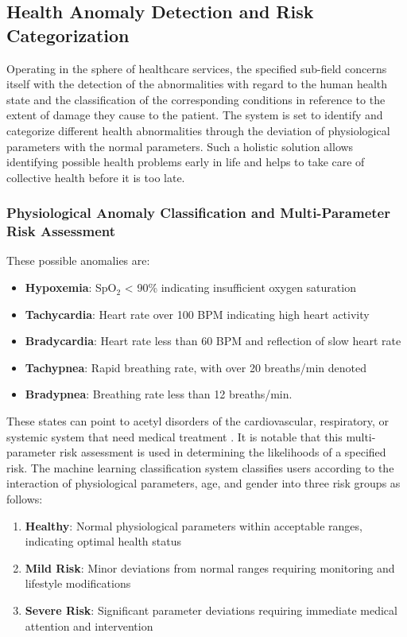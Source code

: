 \documentclass{ieeeaccess}
\begin{document}
\FloatBarrier

\subsection{Health Anomaly Detection and Risk Categorization}

Operating in the sphere of healthcare services, the specified sub-field concerns itself with the detection of the abnormalities with regard to the human health state and the classification of the corresponding conditions in reference to the extent of damage they cause to the patient. The system is set to identify and categorize different health abnormalities through the deviation of physiological parameters with the normal parameters. Such a holistic solution allows identifying possible health problems early in life and helps to take care of collective health before it is too late.

\subsubsection{Physiological Anomaly Classification and Multi-Parameter Risk Assessment}

These possible anomalies are:
\begin{itemize}
\item \textbf{Hypoxemia}: SpO$_2$ < 90\% indicating insufficient oxygen saturation
\item \textbf{Tachycardia}: Heart rate over 100 BPM indicating high heart activity
\item \textbf{Bradycardia}: Heart rate less than 60 BPM and reflection of slow heart rate
\item \textbf{Tachypnea}: Rapid breathing rate, with over 20 breaths/min denoted
\item \textbf{Bradypnea}: Breathing rate less than 12 breaths/min.
\end{itemize}
\vspace{0.5em}



These states can point to acetyl disorders of the cardiovascular, respiratory, or systemic system that need medical treatment \cite{b21}. It is notable that this multi-parameter risk assessment is used in determining the likelihoods of a specified risk. The machine learning classification system classifies users according to the interaction of physiological parameters, age, and gender into three risk groups as follows:

\begin{enumerate}
\item \textbf{Healthy}: Normal physiological parameters within acceptable ranges, indicating optimal health status
\item \textbf{Mild Risk}: Minor deviations from normal ranges requiring monitoring and lifestyle modifications
\item \textbf{Severe Risk}: Significant parameter deviations requiring immediate medical attention and intervention
\end{enumerate}
\end{document}
